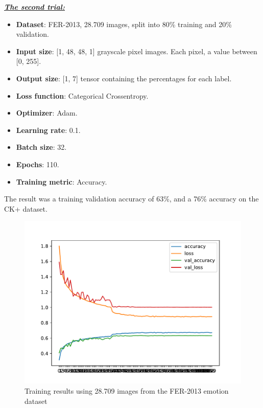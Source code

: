 \documentclass[runningheads,a4paper,11pt]{report}
\begin{document}
\clearpage
\underline{\textbf{\emph{The second trial:}}}
\begin{itemize}
	\item \textbf{Dataset}: FER-2013, 28.709 images, split into 80\% training and 20\% validation.
	\item \textbf{Input size}: [1, 48, 48, 1] grayscale pixel images. Each pixel, a value between [0, 255].
	\item \textbf{Output size}: [1, 7] tensor containing the percentages for each label.
	\item \textbf{Loss function}: Categorical Crossentropy.
	\item \textbf{Optimizer}: Adam.
	\item \textbf{Learning rate}: 0.1.
	\item \textbf{Batch size}: 32.
	\item \textbf{Epochs}: 110.
	\item \textbf{Training metric}: Accuracy.
\end{itemize}
The result was a training validation accuracy of 63\%, and a 76\% accuracy on the CK+ dataset.
\begin{figure}[htbp]
\begin{center}
	\includegraphics[scale=0.8]{Fig/fer_training_28k_01.pdf}
	\caption{Training results using 28.709 images from the FER-2013 emotion dataset}
	\label{fer_training_28k_01}
\end{center}
\end{figure}
\end{document}
